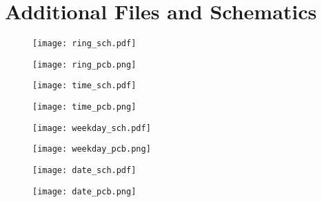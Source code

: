 \chapter{Additional Files and Schematics}

\begin{figure}[h!]
	\centering
	\texttt{[image: ring\_sch.pdf]}
	\caption{}
	\label{fig:ring_sch}
\end{figure}

\begin{figure}[h!]
	\centering
	\texttt{[image: ring\_pcb.png]}
	\caption{}
	\label{fig:ring_pcb}
\end{figure}
\begin{figure}[h!]
	\centering
	\texttt{[image: time\_sch.pdf]}
	\caption{}
	\label{fig:time_sch}
\end{figure}

\begin{figure}[h!]
	\centering
	\texttt{[image: time\_pcb.png]}
	\caption{}
	\label{fig:time_pcb}
\end{figure}
\begin{figure}[h!]
	\centering
	\texttt{[image: weekday\_sch.pdf]}
	\caption{}
	\label{fig:weekday_sch}
\end{figure}

\begin{figure}[h!]
	\centering
	\texttt{[image: weekday\_pcb.png]}
	\caption{}
	\label{fig:weekday_pcb}
\end{figure}
\begin{figure}[h!]
	\centering
	\texttt{[image: date\_sch.pdf]}
	\caption{}
	\label{fig:date_sch}
\end{figure}

\begin{figure}[h!]
	\centering
	\texttt{[image: date\_pcb.png]}
	\caption{}
	\label{fig:date_pcb}
\end{figure}
